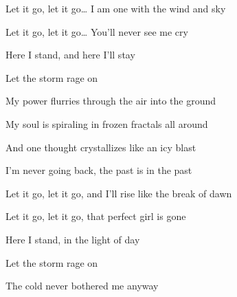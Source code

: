 \begin{song}
\bigskip

Let it go, let it go… I am one with the wind and sky \par
Let it go, let it go… You'll never see me cry \par
{}Here I stand, and here I'll stay \par
Let the storm rage on  \par

\bigskip

 My power flurries through the air into the ground \par
{} My soul is spiraling in frozen fractals all around \par
{} And one thought crystallizes like an icy blast \par
{} I'm never going back, the past is in the past \par
{}  \par

\bigskip

Let it go, let it go, and I'll rise like the break of dawn \par
Let it go, let it go, that perfect girl is gone \par
{}Here I stand, in the light of day \par
{} Let the storm rage on \par
The cold never bothered me anyway \par

\end{song}